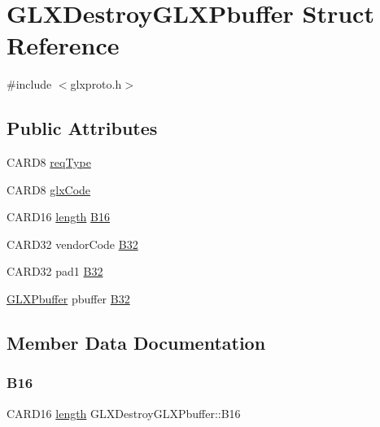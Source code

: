 \hypertarget{struct_g_l_x_destroy_g_l_x_pbuffer}{}\section{G\+L\+X\+Destroy\+G\+L\+X\+Pbuffer Struct Reference}
\label{struct_g_l_x_destroy_g_l_x_pbuffer}


{\ttfamily \#include $<$glxproto.\+h$>$}

\subsection*{Public Attributes}
\begin{DoxyCompactItemize}
\item 
C\+A\+R\+D8 \hyperlink{struct_g_l_x_destroy_g_l_x_pbuffer_a5920aaa695e3323fba99100509c66667}{req\+Type}
\item 
C\+A\+R\+D8 \hyperlink{struct_g_l_x_destroy_g_l_x_pbuffer_a6b99daf82c6b3eca55e8dc6ded9fa70d}{glx\+Code}
\item 
C\+A\+R\+D16 \hyperlink{glcorearb_8h_ab9c919755bde3b34349e23a32b4e0fa7}{length} \hyperlink{struct_g_l_x_destroy_g_l_x_pbuffer_a2a3aac38933dbfe651f1561b86f69367}{B16}
\item 
C\+A\+R\+D32 vendor\+Code \hyperlink{struct_g_l_x_destroy_g_l_x_pbuffer_a78138bfc85fae998487de71a9e7d6c5c}{B32}
\item 
C\+A\+R\+D32 pad1 \hyperlink{struct_g_l_x_destroy_g_l_x_pbuffer_a66fc10574ff2054c0775a7376b7e7cb4}{B32}
\item 
\hyperlink{glx_8h_a0e12899d42d3570d659900a17247cb71}{G\+L\+X\+Pbuffer} pbuffer \hyperlink{struct_g_l_x_destroy_g_l_x_pbuffer_a5b842acef7ed4553321ef5b4c914f201}{B32}
\end{DoxyCompactItemize}


\subsection{Member Data Documentation}
\mbox{\label{struct_g_l_x_destroy_g_l_x_pbuffer_a2a3aac38933dbfe651f1561b86f69367}} 
\subsubsection{\texorpdfstring{B16}{B16}}
{\footnotesize\ttfamily C\+A\+R\+D16 \hyperlink{glcorearb_8h_ab9c919755bde3b34349e23a32b4e0fa7}{length} G\+L\+X\+Destroy\+G\+L\+X\+Pbuffer\+::\+B16}

